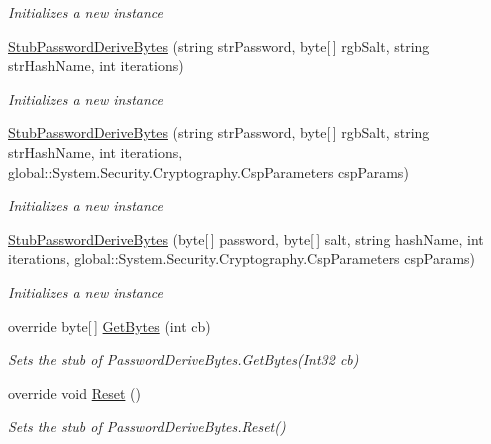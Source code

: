 \begin{DoxyCompactItemize}
\begin{DoxyCompactList}\small\item\em Initializes a new instance\end{DoxyCompactList}\item 
\hyperlink{class_system_1_1_security_1_1_cryptography_1_1_fakes_1_1_stub_password_derive_bytes_a160180a8977df815586657c270f24419}{Stub\-Password\-Derive\-Bytes} (string str\-Password, byte\mbox{[}$\,$\mbox{]} rgb\-Salt, string str\-Hash\-Name, int iterations)
\begin{DoxyCompactList}\small\item\em Initializes a new instance\end{DoxyCompactList}\item 
\hyperlink{class_system_1_1_security_1_1_cryptography_1_1_fakes_1_1_stub_password_derive_bytes_affdc5ca7ece6ae16211d8593dfa1145e}{Stub\-Password\-Derive\-Bytes} (string str\-Password, byte\mbox{[}$\,$\mbox{]} rgb\-Salt, string str\-Hash\-Name, int iterations, global\-::\-System.\-Security.\-Cryptography.\-Csp\-Parameters csp\-Params)
\begin{DoxyCompactList}\small\item\em Initializes a new instance\end{DoxyCompactList}\item 
\hyperlink{class_system_1_1_security_1_1_cryptography_1_1_fakes_1_1_stub_password_derive_bytes_adad2011ccf4a231734137aa97581663d}{Stub\-Password\-Derive\-Bytes} (byte\mbox{[}$\,$\mbox{]} password, byte\mbox{[}$\,$\mbox{]} salt, string hash\-Name, int iterations, global\-::\-System.\-Security.\-Cryptography.\-Csp\-Parameters csp\-Params)
\begin{DoxyCompactList}\small\item\em Initializes a new instance\end{DoxyCompactList}\item 
override byte\mbox{[}$\,$\mbox{]} \hyperlink{class_system_1_1_security_1_1_cryptography_1_1_fakes_1_1_stub_password_derive_bytes_afa13a4b41bda9b4a36d1d03174aabc31}{Get\-Bytes} (int cb)
\begin{DoxyCompactList}\small\item\em Sets the stub of Password\-Derive\-Bytes.\-Get\-Bytes(\-Int32 cb)\end{DoxyCompactList}\item 
override void \hyperlink{class_system_1_1_security_1_1_cryptography_1_1_fakes_1_1_stub_password_derive_bytes_a187a0ed970797847015356b9626c78d3}{Reset} ()
\begin{DoxyCompactList}\small\item\em Sets the stub of Password\-Derive\-Bytes.\-Reset()\end{DoxyCompactList}\end{DoxyCompactItemize}
